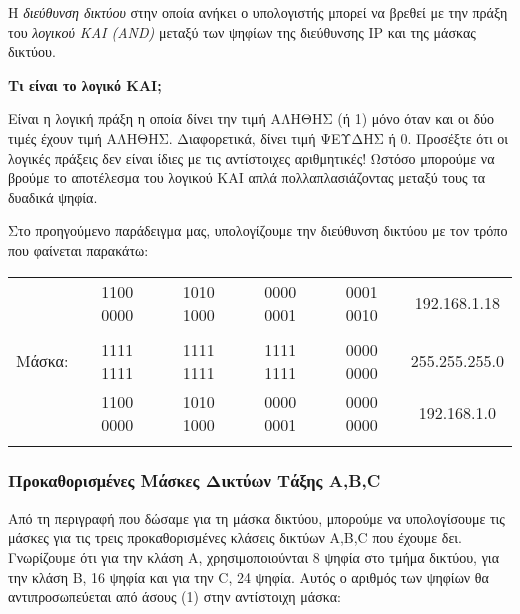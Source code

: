 Η \emph{διεύθυνση δικτύου} στην οποία ανήκει ο υπολογιστής μπορεί να βρεθεί με την πράξη του \emph{λογικού KAI (AND)} μεταξύ των ψηφίων της διεύθυνσης IP και της μάσκας δικτύου. 

\begin{inthebox}
\textbf{Τι είναι το λογικό KAI;}

Είναι η λογική πράξη η οποία δίνει την τιμή ΑΛΗΘΗΣ (ή 1) μόνο όταν και οι δύο τιμές έχουν τιμή ΑΛΗΘΗΣ. Διαφορετικά, δίνει τιμή ΨΕΥΔΗΣ ή 0. Προσέξτε ότι οι λογικές πράξεις δεν είναι ίδιες με τις αντίστοιχες αριθμητικές! Ωστόσο μπορούμε να βρούμε το αποτέλεσμα του λογικού ΚΑΙ απλά πολλαπλασιάζοντας μεταξύ τους τα δυαδικά ψηφία.\\
\end{inthebox}

Στο προηγούμενο παράδειγμα μας, υπολογίζουμε την διεύθυνση δικτύου με τον τρόπο που φαίνεται παρακάτω:

\begin{center}
\fontsize{9}{11}
\ttfamily
\begin{tabular}{|c|c|c|c|c|c|} 
\hline
\multirow{2}{*}{} Διεύθυνση & 1100 0000 & 1010 1000 & 0000 0001 & 0001 0010 & 192.168.1.18 \\
IP: & & & & & \\
\hline
Μάσκα: & 1111 1111 & 1111 1111 & 1111 1111 & 0000 0000 & 255.255.255.0 \\
\hline
\multirow{2}{*}{} Διεύθυνση & 1100 0000 & 1010 1000 & 0000 0001 & 0000 0000 & 192.168.1.0 \\
Δικτύου: & & & & & \\
\hline
\end{tabular}
\normalfont
\end{center}

\subsubsection*{Προκαθορισμένες Μάσκες Δικτύων Τάξης A,B,C}

Από τη περιγραφή που δώσαμε για τη μάσκα δικτύου, μπορούμε να υπολογίσουμε τις μάσκες για τις τρεις προκαθορισμένες κλάσεις δικτύων A,B,C που έχουμε δει. Γνωρίζουμε ότι για την κλάση Α, χρησιμοποιούνται 8 ψηφία στο τμήμα δικτύου, για την  κλάση B, 16 ψηφία και για την C, 24 ψηφία. Αυτός ο αριθμός των ψηφίων θα αντιπροσωπεύεται από άσους (1) στην αντίστοιχη μάσκα:

